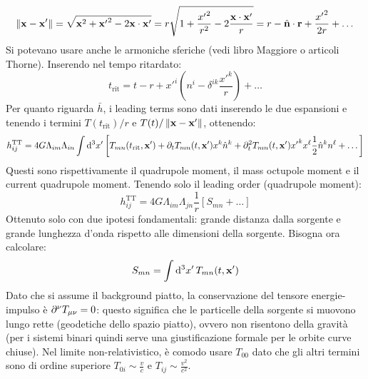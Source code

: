 \begin{equation*}
  \left\lVert\mathbf{x} - \mathbf{x}'\right\rVert = \sqrt{\mathbf{x}^2 + {\mathbf{x}'}^2 - 2 \mathbf{x} \cdot \mathbf{x}'} = r \sqrt{1 + \frac{{x'}^2}{r^2} - 2 \frac{\mathbf{x} \cdot \mathbf{x}'}{r}} = r - \hat{\mathbf{n}} \cdot \mathbf{r} + \frac{{x'}^2}{2r} + \dots
\end{equation*}
Si potevano usare anche le armoniche sferiche (vedi libro Maggiore o articoli Thorne). Inserendo nel tempo ritardato:
\begin{equation*}
  t_\text{rit} = t - r + {x'}^i \left( n^i - \delta^{ik} \frac{{x'}^k}{r} \right) + \dots
\end{equation*}
Per quanto riguarda $ \bar{h} $, i leading terms sono dati inserendo le due espansioni e tenendo i termini $ T(t_\text{rit}) / r $ e $ T(t) / \left\lVert\mathbf{x} - \mathbf{x}'\right\rVert $, ottenendo:
\begin{equation*}
  h_{ij}^\text{TT} = 4 G \Lambda_{im} \Lambda_{in} \int \mathrm{d}^3x' \left[ T_{mn}(t_\text{rit} , \mathbf{x}') + \partial_t T_{mn}(t , \mathbf{x}') x^k \hat{n}^k + \partial_t^2 T_{mn}(t , \mathbf{x}') {x'}^k x^\ell \frac{1}{2} \hat{n}^k n^\ell + \dots \right]
\end{equation*}
Questi sono rispettivamente il quadrupole moment, il mass octupole moment e il current quadrupole moment. Tenendo solo il leading order (quadrupole moment):
\begin{equation}
  h_{ij}^\text{TT} = 4 G \Lambda_{im} \Lambda_{jn} \frac{1}{r} \left[ S_{mn} + \dots \right]
\end{equation}
Ottenuto solo con due ipotesi fondamentali: grande distanza dalla sorgente e grande lunghezza d'onda rispetto alle dimensioni della sorgente. Bisogna ora calcolare:
\begin{equation*}
  S_{mn} = \int \mathrm{d}^3x' \, T_{mn}(t,\mathbf{x}')
\end{equation*}
Dato che si assume il background piatto, la conservazione del tensore energie-impulso è $ \partial^\nu T_{\mu \nu} = 0 $: questo significa che le particelle della sorgente si muovono lungo rette (geodetiche dello spazio piatto), ovvero non risentono della gravità (per i sistemi binari quindi serve una giustificazione formale per le orbite curve chiuse). Nel limite non-relativistico, è comodo usare $ T_{00} $ dato che gli altri termini sono di ordine superiore $ T_{0i} \sim \frac{v}{c} $ e $ T_{ij} \sim \frac{v^2}{c^2} $.


